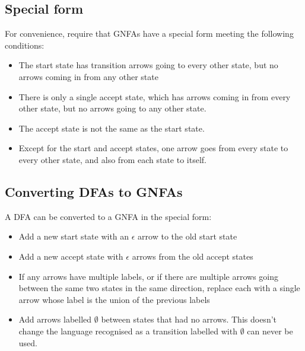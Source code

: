 \documentclass{article}
\begin{document}
\subsection{Special form}
For convenience, require that GNFAs have a special form meeting the following conditions:
\begin{itemize}
	\item The start state has transition arrows going to every other state, but no arrows coming in from any other state
	\item There is only a single accept state, which has arrows coming in from every other state, but no arrows going to any other state.
	\item The accept state is not the same as the start state.
	\item Except for the start and accept states, one arrow goes from every state to every other state, and also from each state to itself.
\end{itemize}

\subsection{Converting DFAs to GNFAs}
A DFA can be converted to a GNFA in the special form:
\begin{itemize}
	\item Add a new start state with an $\epsilon$ arrow to the old start state
	\item Add a new accept state with $\epsilon$ arrows from the old accept states
	\item If any arrows have multiple labels, or if there are multiple arrows going between the same two states in the same direction, replace each with a single arrow whose label is the union of the previous labels
	\item Add arrows labelled $\emptyset$ between states that had no arrows. This doesn't change the language recognised as a transition labelled with $\emptyset$ can never be used.
\end{itemize}
\end{document}
